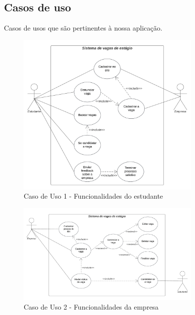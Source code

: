 \subsection{Casos de uso}

Casos de usos que são pertinentes à nossa aplicação.
\begin{figure}[H]
	\centering 
	\caption{\label{fig:caso1}Caso de Uso 1 - Funcionalidades do estudante}
	\includegraphics[width=0.8\textwidth]{imagens/caso-de-uso-1.png} 
\end{figure}

\begin{figure}[H]
	\centering 
	\caption{\label{fig:caso2}Caso de Uso 2 - Funcionalidades da empresa}
	\includegraphics[width=0.8\textwidth]{imagens/caso-de-uso-2.png} 
\end{figure}

